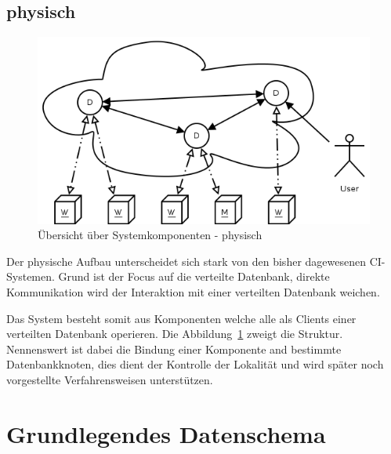 \subsection{physisch}

\begin{figure}[ht] 
  \centering
  \label{fig:grob-layout-komponenten}
  \includegraphics[width=\textwidth]{imageinput/grob-layout-komponenten.png}
  \caption{\"Ubersicht \"uber Systemkomponenten - physisch}
\end{figure}

Der physische Aufbau unterscheidet sich stark von den bisher dagewesenen CI-Systemen.
Grund ist der Focus auf die verteilte Datenbank, direkte Kommunikation
wird der Interaktion mit einer verteilten Datenbank weichen.

Das System besteht somit aus Komponenten welche alle als Clients einer verteilten Datenbank operieren.
Die Abbildung~\ref{fig:grob-layout-komponenten} zweigt die Struktur.
Nennenswert ist dabei die Bindung einer Komponente and bestimmte Datenbankknoten,
dies dient der Kontrolle der Lokalit\"at und wird sp\"ater noch vorgestellte Verfahrensweisen unterst\"utzen.




\section{Grundlegendes Datenschema}


